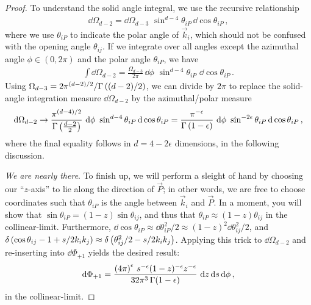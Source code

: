 \begin{proof}
    To understand the solid angle integral, we use the recursive relationship
    \begin{align}
        \dd \Omega_{d-2}
        =
        \dd \Omega_{d-3}
        \,\,
        \sin^{d-4}\theta_{iP} \, \dd \cos \theta_{iP}
        \,,
    \end{align}
    where we use \(\theta_{iP}\) to indicate the polar angle of \(\vec{k}_i\), which should not be confused with the opening angle \(\theta_{ij}\).
    If we integrate over all angles except the azimuthal angle \(\phi \in (0, 2\pi)\) and the polar angle \(\theta_{iP}\), we have
    \begin{align}
        \int
        \dd \Omega_{d-2}
        =
        \frac{\Omega_{d-3}}{2\pi}
        \,
        \dd \phi
        \,\,
        \sin^{d-4}\theta_{iP}
        \,\,
        \dd\cos\theta_{iP}
        \,.
    \end{align}
    Using \(\Omega_{d-3} = 2 \pi^{(d-2)/2} / \Gamma\left((d-2)/2\right)\), we can divide by \(2 \pi\) to replace the solid-angle integration measure \(\dd \Omega_{d-2}\) by the azimuthal/polar measure
    \begin{align}
        \dd \Omega_{d-2}
        \to
        \frac{\pi^{(d-4)/2}}{\Gamma\left(\frac{d-2}{2}\right)}
        \,\,
        \dd\phi
        \,\,
        \sin^{d-4}\theta_{iP}
        \,
        \dd \cos\theta_{iP}
        =
        \frac{\pi^{-\epsilon}}{\Gamma\left(1 - \epsilon\right)}
        \,\,
        \dd\phi
        \,\,
        \sin^{-2\epsilon}\theta_{iP}
        \,
        \dd \cos\theta_{iP}
        \,,
    \end{align}
    where the final equality follows in \(d = 4-2\epsilon\) dimensions, in the following discussion.


    \textit{We are nearly there}.
    To finish up, we will perform a sleight of hand by choosing our ``\(z\)-axis'' to lie along the direction of \(\vec{P}\);
    in other words, we are free to choose coordinates such that \(\theta_{iP}\) is the angle between \(\vec{k}_i\) and \(\vec{P}\).
    In a moment, you will show that \(\sin\theta_{iP} = (1-z) \sin\theta_{ij}\), and thus that \(\theta_{iP} \approx (1-z) \theta_{ij}\) in the \gls{collinear-limit}.
    Furthermore, \(\dd \cos\theta_{iP} \approx \dd \theta_{iP}^2 / 2 \approx (1-z)^2 \dd \theta_{ij}^2 / 2\), and \(\delta\left(\cos\theta_{ij} - 1 + s / 2 k_i k_j\right) \approx \delta\left(\theta_{ij}^2/2 - s / 2 k_i k_j\right)\).
    Applying this trick to \(\dd \Omega_{d-2}\) and re-inserting into \(\dd \Phi_{+1}\) yields the desired result:
    \begin{align}
        \dd \Phi_{+1}
        =
        \frac{\left(4 \pi\right)^\epsilon
            \,
            s^{-\epsilon} (1-z)^{-\epsilon} z^{-\epsilon}}
        {32 \pi^3\, \Gamma(1-\epsilon)}
        \,\,
        \dd z \, \dd s \, \dd \phi
        \,,
    \end{align}
    in the \gls{collinear-limit}.
\end{proof}


